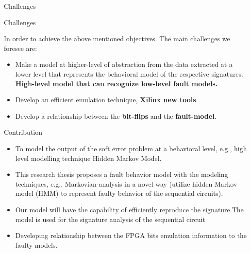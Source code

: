 \documentclass[aspectratio=1610]{beamer}
\newcommand{\semitransp}[2][35]{\color{fg!#1}#2}
\begin{document}
\begin{frame}{Challenges}

\begin{block}{Challenges}

\end{block}


In order to achieve the above mentioned objectives. The main challenges we foresee are:
\begin{itemize}
\item Make a model at higher-level of abstraction from the data extracted at a lower level that represents the behavioral model of the respective signatures. \textbf{High-level model that can recognize low-level fault models.}
\vspace{0.25cm}
\item Develop an efficient emulation technique, \textbf{Xilinx new tools}.
\vspace{0.25cm}
\item Develop a relationship between the \textbf{bit-flips} and the \textbf{fault-model}.


\end{itemize}




\end{frame}



\begin{frame}{Contribution}

\begin{itemize}


 \item To model the output of the soft error problem at a behavioral level, e.g., high level modelling technique Hidden Markov Model.
\vspace{0.25cm}
\item This research thesis proposes a fault behavior model with the modeling techniques, e.g., Markovian-analysis in a novel way (utilize hidden Markov model (HMM) to represent faulty behavior of the sequential circuits).
\vspace{0.25cm}
\item Our model will have the capability of efficiently reproduce the signature.The model is used for the signature analysis of the sequential circuit
\vspace{0.25cm}
\item Developing relationship between the FPGA bits emulation information to the faulty models.




\end{itemize}

\end{frame}
\end{document}
